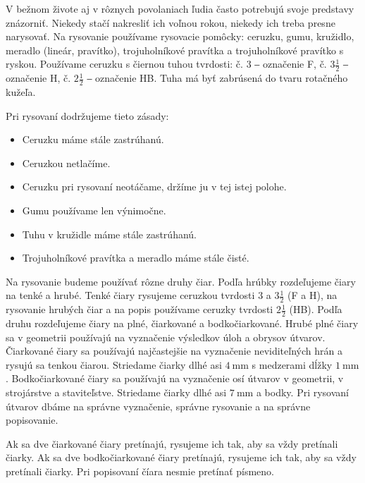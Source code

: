 \documentclass{report}
\begin{document}
\vspace{5em}
\vspace{5em}

V bežnom živote aj v rôznych povolaniach ľudia často potrebujú svoje predstavy znázorniť. Niekedy stačí nakresliť ich voľnou rokou, niekedy ich treba presne narysovať. Na rysovanie používame rysovacie pomôcky: ceruzku, gumu, kružidlo, meradlo (lineár, pravítko), trojuholníkové pravítka a trojuholníkové pravítko s ryskou. Používame ceruzku s čiernou tuhou tvrdosti: č. \(3\) ‒ označenie F, č. \(3 \frac{1}{2}\) ‒ označenie H, č. \(2 \frac{1}{2}\) ‒ označenie HB. Tuha má byť zabrúsená do tvaru rotačného kužeľa.

Pri rysovaní dodržujeme tieto zásady:
\begin{itemize}
  \item Ceruzku máme stále zastrúhanú.
  \item Ceruzkou netlačíme.
  \item Ceruzku pri rysovaní neotáčame, držíme ju v tej istej polohe.
  \item Gumu používame len výnimočne.
  \item Tuhu v kružidle máme stále zastrúhanú.
  \item Trojuholníkové pravítka a meradlo máme stále čisté.
\end{itemize}

Na rysovanie budeme používať rôzne druhy čiar. Podľa hrúbky rozdeľujeme čiary na tenké a hrubé. Tenké čiary rysujeme ceruzkou tvrdosti \(3\) a \(3 \frac{1}{2}\) (F a H), na rysovanie hrubých čiar a na popis používame ceruzky tvrdosti \(2 \frac{1}{2}\) (HB). Podľa druhu rozdeľujeme čiary na plné, čiarkované a bodkočiarkované. Hrubé plné čiary sa v geometrii používajú na vyznačenie výsledkov úloh a obrysov útvarov. Čiarkované čiary sa používajú najčastejšie na vyznačenie neviditeľných hrán a rysujú sa tenkou čiarou. Striedame čiarky dlhé asi \(\SI{4}{\mm}\) s medzerami dĺžky \(\SI{1}{\mm}\). Bodkočiarkované čiary sa používajú na vyznačenie osí útvarov v geometrii, v strojárstve a staviteľstve. Striedame čiarky dlhé asi \(\SI{7}{\mm}\) a bodky. Pri rysovaní útvarov dbáme na správne vyznačenie, správne rysovanie a na správne popisovanie.

Ak sa dve čiarkované čiary pretínajú, rysujeme ich tak, aby sa vždy pretínali čiarky.
Ak sa dve bodkočiarkované čiary pretínajú, rysujeme ich tak, aby sa vždy pretínali čiarky.
Pri popisovaní číara nesmie pretínať písmeno.
\end{document}

